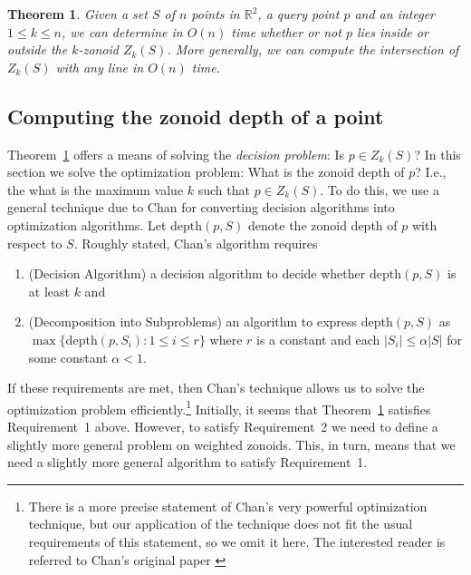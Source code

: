 \documentclass{elsart}
\newtheorem{theorem}{Theorem}
\newcommand{\depth}{\mathrm{depth}}
\begin{document}
\begin{theorem}\label{theorem_decision_problem}
Given a set $S$ of $n$ points in $\mathbb{R}^2$, a query point $p$ and
an integer $1 \le k \le n$, we can determine in $O(n)$ time whether or not $p$ lies inside or outside the $k$-zonoid $Z_k(S)$. More generally, we can compute the intersection of $Z_k(S)$ with any line in $O(n)$ time.
\end{theorem}

\subsection{Computing the zonoid depth of a point}
\label{subsection_computing_the_zonoid_depth_of_a_point}

Theorem~\ref{theorem_decision_problem} offers a means of solving the
\emph{decision problem}: Is $p\in Z_k(S)$?  In this section we solve
the optimization problem:  What is the zonoid depth of $p$? I.e., the
what is the maximum value $k$ such that $p\in Z_k(S)$.  To do this, we
use a general technique due to Chan
\cite{geometric_applications_of_a_randomized_optimization_technique}
for converting decision algorithms into optimization algorithms.  Let
$\depth(p,S)$ denote the zonoid depth of $p$ with respect to $S$.
Roughly stated, Chan's algorithm requires
\begin{enumerate}

\item (Decision Algorithm) a decision algorithm to decide whether
$\depth(p,S)$ is at least $k$ and

\item (Decomposition into Subproblems) an algorithm to express
$\depth(p,S)$ as $\max\{\depth(p,S_i):1\le i\le r\}$ where $r$ is a
constant and each $|S_i|\le \alpha|S|$ for some constant $\alpha < 1$.
\end{enumerate}

If these requirements are met, then Chan's technique
allows us to solve the optimization problem
efficiently.\footnote{There is a more precise statement of Chan's very
powerful optimization technique, but our application of the technique
does not fit the usual requirements of this statement, so we omit it
here.  The interested reader is referred to Chan's original paper
\cite{geometric_applications_of_a_randomized_optimization_technique}}
Initially, it seems that Theorem~\ref{theorem_decision_problem}
satisfies Requirement~1 above.  However, to satisfy Requirement~2 we
need to define a slightly more general problem on weighted zonoids.
This, in turn, means that we need a slightly more general algorithm to
satisfy Requirement~1.
\end{document}
